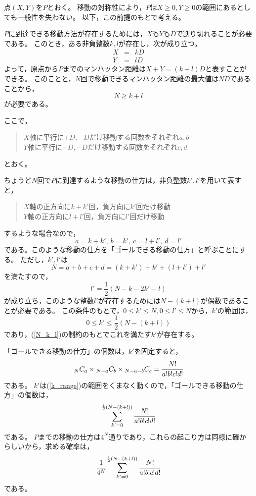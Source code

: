 \documentclass{article}
\begin{document}
点$(X, Y)$を$P$とおく。
移動の対称性により，$P$は$X \geq 0, Y \geq 0$の範囲にあるとしても一般性を失わない。
以下，この前提のもとで考える。

$P$に到達できる移動方法が存在するためには，$X$も$Y$も$D$で割り切れることが必要である。
このとき，ある非負整数$k, l$が存在し，次が成り立つ。
\begin{eqnarray*}
    X &=& kD \\
    Y &=& lD
\end{eqnarray*}
よって，原点から$P$までのマンハッタン距離は$X + Y = (k + l)D$と表すことができる。
このことと，$N$回で移動できるマンハッタン距離の最大値は$ND$であることから，
\begin{equation}
    \label{N_k_l}
    N \geq k + l
\end{equation}
が必要である。

ここで，
\begin{quote}
    $X$軸に平行に$+D, -D$だけ移動する回数をそれぞれ$a, b$ \\
    $Y$軸に平行に$+D, -D$だけ移動する回数をそれぞれ$c, d$
\end{quote}
とおく。

ちょうど$N$回で$P$に到達するような移動の仕方は，非負整数$k', l'$を用いて表すと，
\begin{quote}
    $X$軸の正方向に$k + k'$回，負方向に$k'$回だけ移動 \\
    $Y$軸の正方向に$l + l'$回，負方向に$l'$回だけ移動
\end{quote}
するような場合なので，
$$a = k + k',\ b = k',\ c = l + l',\ d = l'$$
である。このような移動の仕方を「ゴールできる移動の仕方」と呼ぶことにする。
ただし，$k', l'$は
$$N = a + b + c + d = (k + k') + k' + (l + l') + l'$$
を満たすので，
$$l' = \frac{1}{2} (N - k - 2k' - l)$$
が成り立ち，このような整数$l'$が存在するためには$N-(k+l)$が偶数であることが必要である。
この条件のもとで，$0 \leq k' \leq N, 0 \leq l' \leq N$から，$k'$の範囲は，
\begin{equation}
    \label{k_range}
    0 \leq k' \leq \frac{1}{2} (N - (k + l))
\end{equation}
であり，(\ref{N_k_l})の制約のもとでこれを満たす$k'$が存在する。

「ゴールできる移動の仕方」の個数は，$k'$を固定すると，
\[
    {}_N C_a \times {}_{N-a} C_b \times {}_{N-a-b} C_c = \cfrac{N!}{a!b!c!d!}
\]
である。
$k'$は(\ref{k_range})の範囲をくまなく動くので，「ゴールできる移動の仕方」の個数は，
\[
    \sum_{k' = 0}^{ \frac{1}{2} (N - (k + l)) } \cfrac{N!}{a!b!c!d!}
\]
である。
$P$までの移動の仕方は$4^N$通りであり，これらの起こり方は同様に確からしいから，求める確率は，
\begin{equation}
    \label{answer}
    \cfrac{1}{4^N} \sum_{k' = 0}^{ \frac{1}{2} (N - (k + l)) } \cfrac{N!}{a!b!c!d!}
\end{equation}
である。
\end{document}
